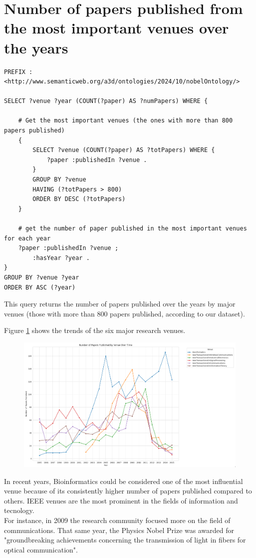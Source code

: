 \documentclass{article}
\begin{document}
\newpage

\section{Number of papers published from the most important venues over the years}

\begin{lstlisting}
PREFIX : <http://www.semanticweb.org/a3d/ontologies/2024/10/nobelOntology/>

SELECT ?venue ?year (COUNT(?paper) AS ?numPapers) WHERE {

    # Get the most important venues (the ones with more than 800 papers published)
    {
        SELECT ?venue (COUNT(?paper) AS ?totPapers) WHERE {
            ?paper :publishedIn ?venue .
        }
        GROUP BY ?venue
        HAVING (?totPapers > 800)
        ORDER BY DESC (?totPapers)
    }

    # get the number of paper published in the most important venues for each year
    ?paper :publishedIn ?venue ;
        :hasYear ?year .
}
GROUP BY ?venue ?year
ORDER BY ASC (?year)
\end{lstlisting}

This query returns the number of papers published over the years by major
venues (those with more than 800 papers published, according to our dataset).

Figure \ref{fig:papersPerVenue} shows the trends of the six major research venues.

\begin{figure}[H]
	\centering
	\label{fig:papersPerVenue}
	\includegraphics[width=\textwidth]{../queries/plots/papersPerVenue.png}
\end{figure}

In recent years, Bioinformatics could be considered one of the most influential
venue because of its consistently higher number of papers published compared to others.
IEEE venues are the most prominent in the fields of information and tecnology.\\
For instance, in 2009 the research community focused more on the field of
communications.
That same year, the Physics Nobel Prize was awarded for "groundbreaking achievements
concerning the transmission of light in fibers for optical communication".
\end{document}
